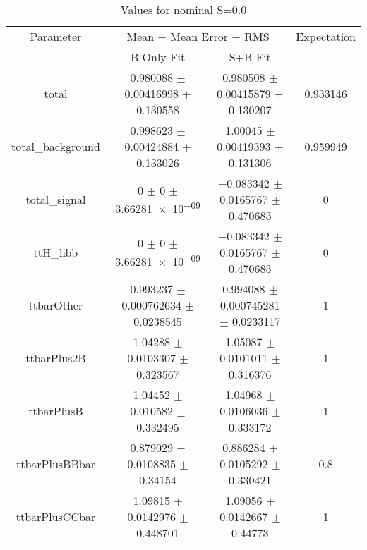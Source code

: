 \begin{table}
\centering
\caption{Values for nominal S=0.0}
\begin{tabular}{cccc}
\toprule
Parameter & \multicolumn{2}{c}{Mean $\pm$ Mean Error $\pm$ RMS} & Expectation\\
 & B-Only Fit & S+B Fit & \\
\midrule
total & \num{0.980088} $\pm$ \num{0.00416998} $\pm$ \num{0.130558} & \num{0.980508} $\pm$ \num{0.00415879} $\pm$ \num{0.130207} & \num{0.933146}\\
total\_background & \num{0.998623} $\pm$ \num{0.00424884} $\pm$ \num{0.133026} & \num{1.00045} $\pm$ \num{0.00419393} $\pm$ \num{0.131306} & \num{0.959949}\\
total\_signal & \num{0} $\pm$ \num{0} $\pm$ \num{3.66281e-09} & \num{-0.083342} $\pm$ \num{0.0165767} $\pm$ \num{0.470683} & \num{0}\\
ttH\_hbb & \num{0} $\pm$ \num{0} $\pm$ \num{3.66281e-09} & \num{-0.083342} $\pm$ \num{0.0165767} $\pm$ \num{0.470683} & \num{0}\\
ttbarOther & \num{0.993237} $\pm$ \num{0.000762634} $\pm$ \num{0.0238545} & \num{0.994088} $\pm$ \num{0.000745281} $\pm$ \num{0.0233117} & \num{1}\\
ttbarPlus2B & \num{1.04288} $\pm$ \num{0.0103307} $\pm$ \num{0.323567} & \num{1.05087} $\pm$ \num{0.0101011} $\pm$ \num{0.316376} & \num{1}\\
ttbarPlusB & \num{1.04452} $\pm$ \num{0.010582} $\pm$ \num{0.332495} & \num{1.04968} $\pm$ \num{0.0106036} $\pm$ \num{0.333172} & \num{1}\\
ttbarPlusBBbar & \num{0.879029} $\pm$ \num{0.0108835} $\pm$ \num{0.34154} & \num{0.886284} $\pm$ \num{0.0105292} $\pm$ \num{0.330421} & \num{0.8}\\
ttbarPlusCCbar & \num{1.09815} $\pm$ \num{0.0142976} $\pm$ \num{0.448701} & \num{1.09056} $\pm$ \num{0.0142667} $\pm$ \num{0.44773} & \num{1}\\
\bottomrule
\end{tabular}
\end{table}